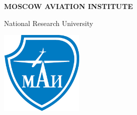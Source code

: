 \begin{center} \vfill
\thispagestyle{empty}
\textbf{\Large MOSCOW AVIATION INSTITUTE}

{\large National Research University\vfill

\Coursecode

\Semester} \vfill

\includegraphics[width=40mm]{pics/MAI.png} \vfill

\emph{\Large \thetitle} \vfill

{\large \theauthor} \vfill

\end{center} \clearpage
